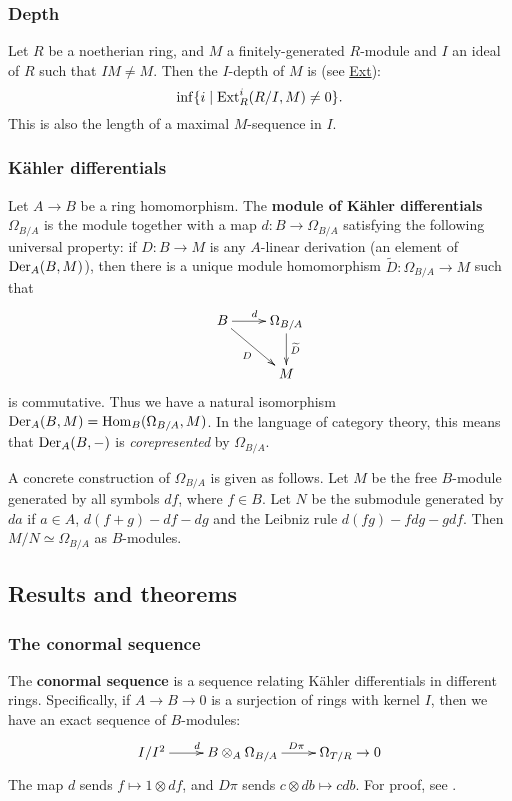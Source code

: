 \documentclass[11pt, english]{article}
\begin{document}
\subsubsection{Depth}
Let $R$ be a noetherian ring, and $M$ a finitely-generated $R$-module and $I$ an ideal of $R$ such that $IM \neq M$. Then the $I$-depth of $M$ is (see \hyperref[ext]{Ext}): \[\inf\{i \mid \operatorname{\mathrm{Ext}}^i_R(R/I,M) \neq 0\}.\]
This is also the length of a maximal $M$-sequence in $I$.

\subsubsection{Kähler differentials}
\label{kahlerdifferentials}

Let $A \to B$ be a ring homomorphism. The \textbf{module of Kähler differentials} $\Omega_{B/A}$ is the module together with a map $d:B \to \Omega_{B/A}$ satisfying the following universal property: if $D:B \to M$ is any $A$-linear derivation (an element of $\operatorname{Der}_A(B,M)$), then there is a unique module homomorphism $\widetilde D:\Omega_{B/A} \to M$ such that
\[
\xymatrix{
B \ar[r]^d  \ar[dr]_D & \Omega_{B/A} \ar[d]^{\widetilde D} \\
 & M
}
\]
is commutative. Thus we have a natural isomorphism $\operatorname{Der}_A(B,M)=\operatorname{Hom}_B(\Omega_{B/A},M)$. In the language of category theory, this means that $\operatorname{Der}_A(B,-)$ is \emph{corepresented} by $\Omega_{B/A}$. 

A concrete construction of $\Omega_{B/A}$ is given as follows. Let $M$ be the free $B$-module generated by all symbols $df$, where $f \in B$. Let $N$ be the submodule generated by $da$ if $a \in A$, $d(f+g)-df-dg$ and the Leibniz rule $d(fg)-fdg-gdf$. Then $M/N \simeq \Omega_{B/A}$ as $B$-modules.

\subsection{Results and theorems}
\subsubsection{The conormal sequence}
\label{conormalsequence}

The \textbf{conormal sequence} is a sequence relating Kähler differentials in different rings. Specifically, if $A \to B \to 0$ is a surjection of rings with kernel $I$, then we have an exact sequence of $B$-modules:
\[
\xymatrix{
I/I^2 \ar[r]^d & B \otimes_A \Omega_{B/A} \ar[r]^{D\pi} & \Omega_{T/R} \to 0
}
\]
The map $d$ sends $f \mapsto 1 \otimes df$, and $D \pi$ sends $c \otimes db \mapsto c db$. For proof, see \cite[Chapter 16]{eisenbud}.
\end{document}
